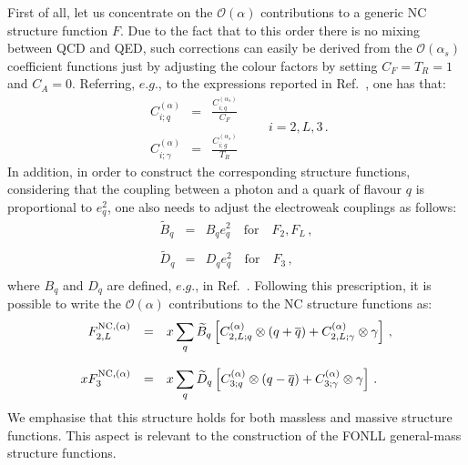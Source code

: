 First of all, let us concentrate on the $\mathcal{O}(\alpha)$
contributions to a generic NC structure function $F$.
%
Due to the fact that to this order there is no mixing between QCD and
QED, such corrections can easily be derived from the
$\mathcal{O}(\alpha_s)$ coefficient functions just by adjusting the
colour factors by setting $C_F=T_R=1$ and $C_A=0$.
%
Referring, $e.g.$, to the expressions reported in
Ref.~\cite{Ellis:1991qj}, one has that:
\begin{equation}\label{eq:alphaCFs}
\begin{array}{rcl}
\displaystyle C_{i;q}^{(\alpha)} &=& \displaystyle \frac{C_{i;q}^{(\alpha_s)}}{C_F}\\
\\
\displaystyle C_{i;\gamma}^{(\alpha)} &=& \displaystyle \frac{C_{i;g}^{(\alpha_s)}}{T_R}
\end{array}\qquad i = 2,L,3\,.
\end{equation}
In addition, in order to construct the corresponding structure
functions, considering that the coupling between a photon and a quark
of flavour $q$ is proportional to $e_q^2$, one also needs to adjust
the electroweak couplings as follows:
 \begin{equation}
\begin{array}{rcl}
\widetilde{B}_q &=& B_qe_q^2\quad\mbox{for}\quad F_2,F_L\,, \\
\\
\widetilde{D}_q &=& D_qe_q^2\quad\mbox{for}\quad F_3\,, \\
\end{array}
\end{equation}
where $B_q$ and $D_q$ are defined, $e.g.$, in
Ref.~\cite{Adloff:2003uh}.
%
Following this prescription, it is possible to write the
$\mathcal{O}(\alpha)$ contributions to the NC structure functions as:
\begin{equation}
\begin{array}{rcl}
F_{2,L}^{{\rm NC},(\alpha)} &=& \displaystyle x \sum_{q} \widetilde{B}_q\left[C_{2,L;q}^{(\alpha)}\otimes
(q+\overline{q}) + C_{2,L;\gamma}^{(\alpha)} \otimes \gamma
                         \right]\,,\\
\\
xF_3^{{\rm NC},(\alpha)} &=& \displaystyle x \sum_{q} \widetilde{D}_q\left[C_{3;q}^{(\alpha)}\otimes
(q-\overline{q}) + C_{3;\gamma}^{(\alpha)} \otimes \gamma
                         \right]\,.
\end{array}
\end{equation}
We emphasise that this structure holds for both massless and massive
structure functions. This aspect is relevant to the construction of
the FONLL general-mass structure functions.

